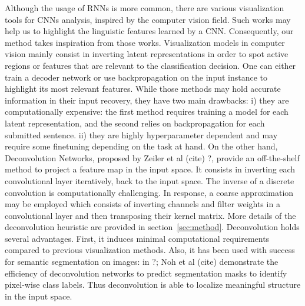 Although the usage of RNNs is more common, there are various visualization tools for CNNs analysis, 
inspired by the computer vision field. Such works may help us to highlight the linguistic features learned by a 
CNN. Consequently, our method takes inspiration from those works. Visualization models in computer vision mainly consist 
in inverting latent representations in order to spot active regions or features that are relevant to the classification decision.
One can either train a decoder network or use backpropagation on the input instance to highlight its most relevant features. 
While those methods may hold accurate information in their input recovery, they have two main drawbacks: 
i) they are computationally expensive: the first method requires training a model for each latent representation, and the second relies 
on backpropagation for each submitted sentence. ii) they are highly hyperparameter dependent and may require some finetuning depending on the task at hand.
On the other hand, Deconvolution Networks, proposed by Zeiler et al (cite) ?, provide an off-the-shelf method to project a feature map in the input 
space. It consists in inverting each convolutional layer iteratively, back to the input space. The inverse of a discrete convolution is 
computationally challenging. In response, a coarse approximation may be employed which consists of inverting channels and filter weights 
in a convolutional layer and then transposing their kernel matrix. More details of the deconvolution heuristic are provided in section~\ref{sec:method}.
Deconvolution holds several advantages. First, it induces minimal computational requirements compared to previous visualization methods. 
Also, it has been used with success for semantic segmentation on images: in ?; Noh et al (cite) demonstrate the efficiency of deconvolution networks 
to predict segmentation masks to identify pixel-wise class labels. Thus deconvolution is able to localize meaningful structure in the input space.
